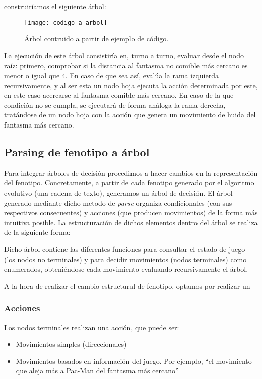construiríamos el siguiente árbol:
\begin{figure}[H]
\centering
\texttt{[image: codigo-a-arbol]}
\caption{Árbol contruido a partir de ejemplo de código.}
\end{figure}
La ejecución de este árbol consistiría en, turno a turno, evaluar desde el nodo raíz: primero, comprobar si la distancia al fantasma no comible más cercano es menor o igual que 4. En caso de que sea así, evalúa la rama izquierda recursivamente, y al ser esta un nodo hoja ejecuta la acción determinada por este, en este caso acercarse al fantasma comible más cercano. En caso de la que condición no se cumpla, se ejecutará de forma análoga la rama derecha, tratándose de un nodo hoja con la acción que genera un movimiento de huida del fantasma más cercano. 

\subsection{Parsing de fenotipo a árbol}
Para integrar árboles de decisión procedimos a hacer cambios en la representación del fenotipo. Concretamente, a partir de cada fenotipo generado por el algoritmo evolutivo (una cadena de texto), generamos un árbol de decisión. El árbol generado mediante dicho metodo de \textit{parse} organiza condicionales (con sus respectivos consecuentes) y acciones (que producen movimientos) de la forma más intuitiva posible. La estructuración de dichos elementos dentro del árbol se realiza de la siguiente forma:

Dicho árbol contiene las diferentes funciones para consultar el estado de juego (los nodos no terminales) y para decidir movimientos (nodos terminales) como enumerados, obteniéndose cada movimiento evaluando recursivamente el árbol.

A la hora de realizar el cambio estructural de fenotipo, optamos por realizar un 

\subsubsection{Acciones}
Los nodos terminales realizan una acción, que puede ser:
\begin{itemize}
\item Movimientos simples (direccionales)
\item Movimientos basados en información del juego. Por ejemplo, ``el movimiento que aleja más a Pac-Man del fantasma más cercano''
\end{itemize}

